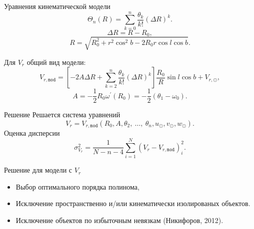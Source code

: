 \documentclass{beamer}
\begin{document}
\begin{frame}{Уравнения кинематической модели}
	\begin{equation}
		\Theta_n(R) = \sum^n_{k = 0} \frac{\theta_k}{k!} \left( \Delta R \right)^k.
	\end{equation}
\begin{equation}
\Delta R = R - R_0,
\end{equation}
\begin{equation}
	R = \sqrt{R_0^2 + r^2 \cos^2{b} - 2R_0 r \cos{l} \cos{b}}.
\end{equation}


	Для $V_r$ общий вид модели:
	\begin{equation}
		V_{r, \texttt{mod}} = \left[ -2A\Delta R + \sum^n_{k = 2} \frac{\theta_k}{k!} \left( \Delta R \right)^k \right] \frac{R_0}{R} \sin{l} \cos{b} + V_{r, \odot},
	\end{equation}
	\begin{equation}
		A = - \frac{1}{2} R_0 \omega^{'}(R_0) = - \frac{1}{2} (\theta_1 - \omega_0).
	\end{equation}
\end{frame}

\begin{frame}{Решение}
	Решается система уравнений
	\begin{equation}
		V_r = V_{r, \texttt{mod}} (R_0, A, \theta_2, \:\ldots,\: \theta_n, u_{\odot}, v_{\odot}, w_{\odot}).
	\end{equation}
	Оценка дисперсии
	\begin{equation}
		\sigma^2_{V_r} = \frac{1}{N - n - 4} \sum^N_{i = 1} \left( V_r - V_{r, \texttt{mod}} \right)^2_i.
	\end{equation}
\end{frame}

\begin{frame}{Решение для модели с $V_r$}
\begin{itemize}
\item Выбор оптимального порядка полинома,
\item Исключение пространственно и/или кинематически изолированых объектов.
\item Исключение объектов по избыточным невязкам (Никифоров, 2012).
\end{itemize}
\end{frame}
\end{document}
